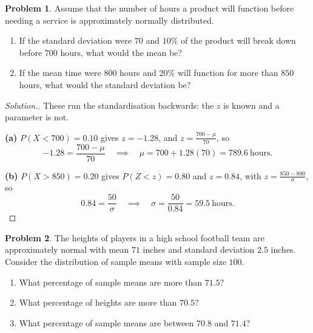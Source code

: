 \documentclass[11pt,a4paper]{article}
\theoremstyle{definition}
\newtheorem{problemx}{Problem}[section]
\newenvironment{problem}{\begin{problemx}}{\end{problemx}}
\newenvironment{solution}
  {\renewcommand{\qedsymbol}{}\begin{proof}[\textit{Solution}.]}
  {\end{proof}}
\begin{document}
\begin{problem}
Assume that the number of hours a product will function before needing a service is
approximately normally distributed.
\begin{enumerate}
\item[(a).] If the standard deviation were $70$ and $10\%$ of the product will break down
before $700$ hours, what would the mean be?
\item[(b).] If the mean time were $800$ hours and $20\%$ will function for more than $850$
hours, what would the standard deviation be?
\end{enumerate}
\end{problem}

\begin{solution}
These run the standardisation backwards: the $z$ is known and a parameter is not.

\textbf{(a)} $P(X<700)=0.10$ gives $z=-1.28$, and $z=\frac{700-\mu}{70}$, so
\[-1.28=\frac{700-\mu}{70}\quad\implies\quad \mu=700+1.28(70)=789.6\ \text{hours}.\]

\textbf{(b)} $P(X>850)=0.20$ gives $P(Z<z)=0.80$ and $z=0.84$, with
$z=\frac{850-800}{\sigma}$, so
\[0.84=\frac{50}{\sigma}\quad\implies\quad \sigma=\frac{50}{0.84}=59.5\ \text{hours}.\]
\end{solution}

\begin{problem}
The heights of players in a high school football team are approximately normal with mean
$71$ inches and standard deviation $2.5$ inches. Consider the distribution of sample means
with sample size $100$.
\begin{enumerate}
\item[(a).] What percentage of sample means are more than $71.5$?
\item[(b).] What percentage of heights are more than $70.5$?
\item[(c).] What percentage of sample means are between $70.8$ and $71.4$?
\end{enumerate}
\end{problem}
\end{document}
